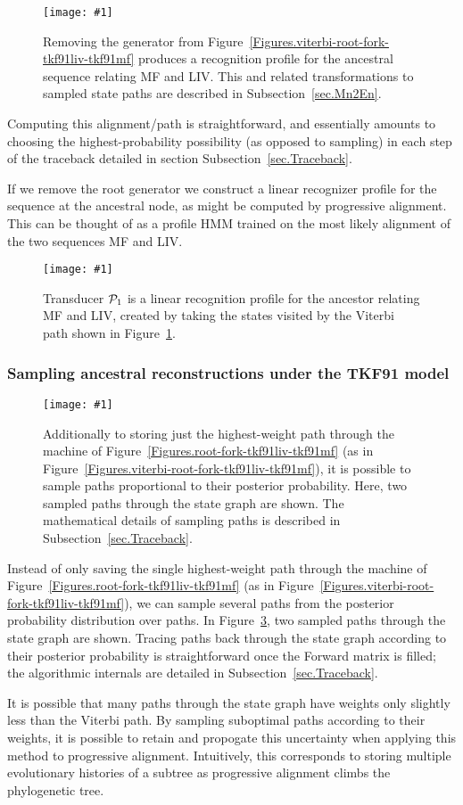 \documentclass{article}
\newcommand{\secref}[1]{Subsection~\ref{sec.#1}}
\newcommand{\figref}[1]{Figure~\ref{Figures.#1}}
\newcommand{\figlabel}[1]{\label{Figures.#1}}
\newcommand{\easyfig}[4]{
\begin{figure}
\texttt{[image: \#1]}
\caption{ \figlabel{#3} #4}
\end{figure}}
\newcommand{\widepngfig}[2]{\easyfig{#1.png}{width=\textwidth}{#1}{#2}}
\newcommand{\widepdffig}[2]{\easyfig{#1-fig.pdf}{width=\textwidth}{#1}{#2}}
\newcommand{\tallpdffig}[2]{\easyfig{#1-fig.pdf}{height=\textheight}{#1}{#2}}
\newcommand\profile{{\cal P}}
\begin{document}
\widepdffig{viterbi-fork-tkf91liv-tkf91mf}{Removing the generator from \figref{viterbi-root-fork-tkf91liv-tkf91mf} produces a 
recognition profile for the ancestral sequence relating MF and LIV. 
This and related transformations to sampled state paths are described in \secref{Mn2En}.}

Computing this alignment/path is straightforward, and essentially amounts to choosing
the highest-probability possibility (as opposed to sampling) 
in each step of the traceback detailed in
section \secref{Traceback}.  

If we remove  the root generator we  construct a linear recognizer profile
for the sequence at the ancestral node,
as might be computed by progressive alignment.  
This can be thought of as a profile HMM trained on the most likely alignment 
of the two sequences MF and LIV.  

\tallpdffig{viterbi-profile}{Transducer $\profile_1$ is a linear recognition profile for the 
ancestor relating MF and LIV, created by taking the states visited by the Viterbi path shown in \figref{viterbi-fork-tkf91liv-tkf91mf}.}


\subsubsection{Sampling ancestral reconstructions under the TKF91 model}

\widepngfig{forward2-root-fork-tkf91liv-tkf91mf}{
Additionally to storing just the highest-weight path through
the machine of \figref{root-fork-tkf91liv-tkf91mf}
(as in \figref{viterbi-root-fork-tkf91liv-tkf91mf}),
it is possible to sample paths proportional to their posterior probability.  
Here, two sampled paths through the state graph are shown. 
The mathematical details of sampling paths is described in \secref{Traceback}.}

Instead of only saving the single highest-weight path through
the machine of \figref{root-fork-tkf91liv-tkf91mf}
(as in \figref{viterbi-root-fork-tkf91liv-tkf91mf}),
we can sample several paths from the posterior probability distribution over paths.  
In \figref{forward2-root-fork-tkf91liv-tkf91mf}, two sampled paths through the 
state graph are shown.  
Tracing paths back through the state graph according to their posterior probability
is straightforward once the Forward matrix is filled; 
the algorithmic internals are detailed in \secref{Traceback}. 


It is possible that many paths through the state graph have weights only slightly less than the 
Viterbi path.
By sampling suboptimal paths according to their weights, it is possible to retain and 
propogate  this uncertainty when applying this method to progressive alignment. 
Intuitively, this corresponds to storing multiple evolutionary histories of a subtree
as  progressive alignment climbs the phylogenetic tree.  
\end{document}
